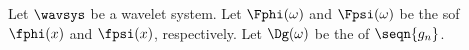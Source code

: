 \begin{proposition}
\label{prop:vsmra_real_Fpsi}
\label{prop:psi_g_phi}
Let $\wavsys$ be a wavelet system.
Let $\Fphi(\omega)$ and $\Fpsi(\omega)$ be the sof $\fphi(x)$ and $\fpsi(x)$, respectively.
Let $\Dg(\omega)$ be the of $\seqn{g_n}$.
\end{proposition}

